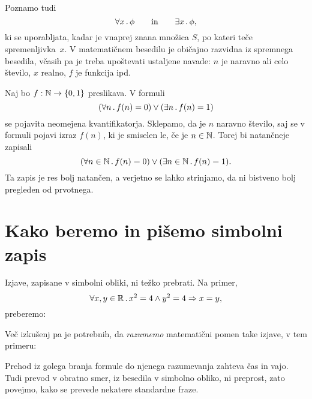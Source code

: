 Poznamo tudi  
%
\begin{equation*}
  \forall x \,.\, \phi
  \qquad\text{in}\qquad
  \exists x \,.\, \phi,
\end{equation*}
%
ki se uporabljata, kadar je vnaprej znana množica $S$,
po kateri teče spremenljivka~$x$. V matematičnem besedilu je običajno
razvidna iz spremnega besedila, včasih pa je treba upoštevati
ustaljene navade: $n$ je naravno ali celo število, $x$ realno, $f$ je
funkcija ipd.

\begin{zgled}
  Naj bo $f : \mathbb{N} \to \left\{0, 1\right\}$ preslikava. V formuli
  \begin{equation*}
    (\forall n \,.\, f(n) = 0) \lor (\exists n \,.\, f(n) = 1)
  \end{equation*}
  se pojavita neomejena kvantifikatorja. Sklepamo, da je $n$ naravno število, saj se v formuli pojavi izraz $f(n)$,
  ki je smiselen le, če je $n \in \mathbb{N}$. Torej bi natančneje zapisali
  \begin{equation*}
    (\forall n \in \mathbb{N} \,.\, f(n) = 0) \lor (\exists n \in \mathbb{N} \,.\, f(n) = 1).
  \end{equation*}
  Ta zapis je res bolj natančen, a verjetno se lahko strinjamo, da ni bistveno bolj pregleden od prvotnega.
\end{zgled}




\section{Kako beremo in pišemo simbolni zapis}
\label{sec:simbolni-zapis}

Izjave, zapisane v simbolni obliki, ni težko prebrati. Na primer,
%
\begin{equation*}
  \forall x, y \in \mathbb{R} \,.\,
    x^2 = 4 \land y^2 = 4 \Rightarrow x = y,
\end{equation*}
%
preberemo:
%
\begin{quote}
\end{quote}
%
Več izkušenj pa je potrebnih, da \emph{razumemo} matematični pomen
take izjave, v tem primeru:
%
\begin{quote}
\end{quote}
%
Prehod iz golega branja formule do njenega razumevanja zahteva čas in vajo.
Tudi prevod v obratno smer, iz besedila v simbolno obliko, ni preprost,
zato povejmo, kako se prevede nekatere standardne fraze.

